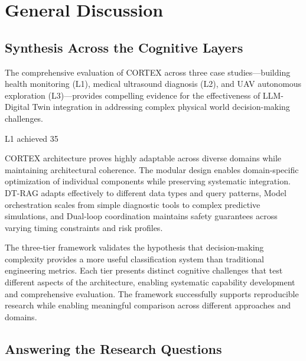 
\chapter{General Discussion} \label{chp:discussion}

\section{Synthesis Across the Cognitive Layers}

The comprehensive evaluation of CORTEX across three case studies—building health monitoring (L1), medical ultrasound diagnosis (L2), and UAV autonomous exploration (L3)—provides compelling evidence for the effectiveness of LLM-Digital Twin integration in addressing complex physical world decision-making challenges.

L1 achieved 35%

CORTEX architecture proves highly adaptable across diverse domains while maintaining architectural coherence. The modular design enables domain-specific optimization of individual components while preserving systematic integration. DT-RAG adapts effectively to different data types and query patterns, Model orchestration scales from simple diagnostic tools to complex predictive simulations, and Dual-loop coordination maintains safety guarantees across varying timing constraints and risk profiles.

The three-tier framework validates the hypothesis that decision-making complexity provides a more useful classification system than traditional engineering metrics. Each tier presents distinct cognitive challenges that test different aspects of the architecture, enabling systematic capability development and comprehensive evaluation. The framework successfully supports reproducible research while enabling meaningful comparison across different approaches and domains.

\section{Answering the Research Questions}

